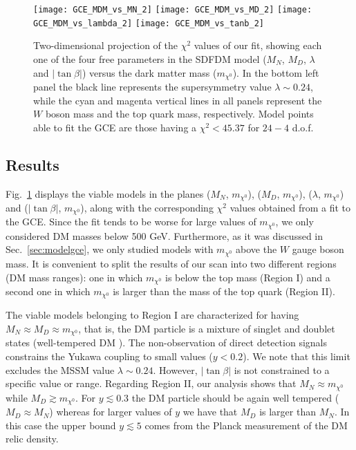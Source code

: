 \begin{figure}[h]
\begin{center}
\texttt{[image: GCE\_MDM\_vs\_MN\_2]}  \texttt{[image: GCE\_MDM\_vs\_MD\_2]} 
\texttt{[image: GCE\_MDM\_vs\_lambda\_2]}  \texttt{[image: GCE\_MDM\_vs\_tanb\_2]}
\caption{Two-dimensional projection of the $\chi^2$ values of our fit, showing each one of the four free parameters in the SDFDM model ($M_N$, $M_D$, $\lambda$ and $|\tan \beta|$) versus the dark matter mass ($m_{\chi^0}$). 
In the bottom left panel the black line represents the supersymmetry value $\lambda\sim 0.24$, while the cyan and magenta vertical lines in all panels represent the $W$ boson mass and the top quark mass, respectively. Model points able to fit the GCE are those having a $\chi^2<45.37$ for $24-4$ d.o.f.}
\label{fig:parameters}
\end{center}
\end{figure}


\subsection{Results}
\label{subsec:Results}
Fig.~\ref{fig:parameters} displays the viable models in the planes ($M_N$, $m_{\chi^0}$),  ($M_D$, $m_{\chi^0}$),  ($\lambda$, $m_{\chi^0}$) and  ($|\tan\beta|$, $m_{\chi^0}$), along with the corresponding $\chi^2$ values obtained from a fit to the GCE. 
Since the fit tends to be worse for large values of $m_{\chi^0}$, we only considered DM masses  below 500 GeV. 
Furthermore, as it was discussed in Sec.~\ref{sec:modelgce}, we only studied models with $m_{\chi^0}$ above the $W$ gauge boson mass. 
It is convenient to split the results of our scan into two different regions (DM mass ranges): one in which $m_{\chi^0}$ is below the top mass (Region I) and a second one in which $m_{\chi^0}$ is larger than the mass of the top quark (Region II).  

The viable models belonging to Region I are characterized for having  $M_N\approx M_D\approx m_{\chi^0}$, that is, the DM particle is a mixture of singlet and doublet states (well-tempered DM \cite{ArkaniHamed:2006mb,Cheung:2013dua}). 
The non-observation of direct detection signals constrains the Yukawa coupling to small values ($y<0.2$). We note that this limit excludes the MSSM value $\lambda \sim 0.24$. However, $|\tan\beta|$ is not constrained to a specific value or range. 
Regarding Region II, our analysis shows that $M_N\approx m_{\chi^0}$ while $M_D\gtrsim m_{\chi^0}$. For $y\lesssim 0.3$ the DM particle should be again well tempered ($M_D\approx M_N$) whereas for larger values of $y$ we have that $M_D$ is larger than $M_N$.      
In this case the upper bound $y\lesssim 5$ comes from the Planck measurement of the DM relic density.

